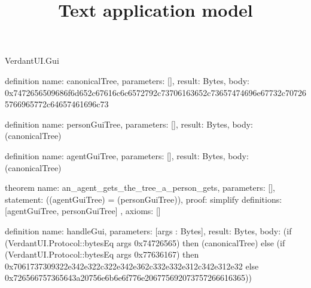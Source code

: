\begin{lexlean}{VerdantUI.Gui}
\title{Text application model}
\begin{semanticmodule}
definition{
  name: canonicalTree,
  parameters: [],
  result: Bytes,
  body: 0x7472656509686f6d652c67616c6c6572792c73706163652c73657474696e67732c707265766965772c64657461696c73
}

definition{
  name: personGuiTree,
  parameters: [],
  result: Bytes,
  body: (canonicalTree)
}

definition{
  name: agentGuiTree,
  parameters: [],
  result: Bytes,
  body: (canonicalTree)
}

theorem{
  name: an_agent_gets_the_tree_a_person_gets,
  parameters: [],
  statement: ((agentGuiTree) = (personGuiTree)),
  proof: simplify{
    definitions: [agentGuiTree, personGuiTree]
  },
  axioms: []
}

definition{
  name: handleGui,
  parameters: [args : Bytes],
  result: Bytes,
  body: (if (VerdantUI.Protocol::bytesEq args 0x74726565) then (canonicalTree) else
    (if (VerdantUI.Protocol::bytesEq args 0x77636167) then 0x7061737309322e342e322c322e342e362c332e332e312c342e312e32 else
    0x726566757365643a20756e6b6e6f776e206775692073757266616365))
}
\end{semanticmodule}
\end{lexlean}
